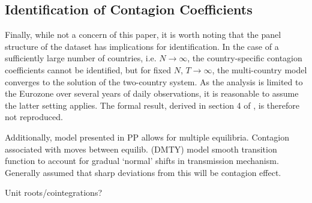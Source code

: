 \documentclass[../base.tex]{subfiles}
\begin{document}
\subsection{Identification of Contagion Coefficients}
\label{ident}

Finally, while not a concern of this paper, it is worth noting that the panel structure of the dataset has implications for identification. In the case of a sufficiently large number of countries, i.e. $N \rightarrow \infty$, the country-specific contagion coefficients cannot be identified, but for fixed $N$, $T \rightarrow \infty$, the multi-country model converges to the solution of the two-country system. As the analysis is limited to the Eurozone over several years of daily observations, it is reasonable to assume the latter setting applies. The formal result, derived in section 4 of \cite{pesaran2007econometric}, is therefore not reproduced.

Additionally, model presented in PP allows for multiple equilibria. Contagion associated with moves between equilib. \cite{dungey2015endogenous} (DMTY) model smooth transition function to account for gradual `normal' shifts in transmission mechanism. Generally assumed that sharp deviations from this will be contagion effect. 

Unit roots/cointegrations?
\end{document}
